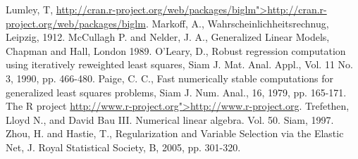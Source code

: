 \documentclass[10pt]{article} %
\begin{document}
\begin{thebibliography}{99}
 Lumley, T, \url{http://cran.r-project.org/web/packages/biglm">http://cran.r-project.org/web/packages/biglm}.
 Markoff, A., Wahrscheinlichheitsrechnug,  Leipzig, 1912.
 McCullagh P. and Nelder, J. A., Generalized Linear Models, Chapman and Hall, London 1989.
 O'Leary, D., Robust regression computation using iteratively reweighted least squares, Siam J. Mat. Anal. Appl., Vol. 11 No. 3, 1990, pp. 466-480.
 Paige, C. C., Fast numerically stable computations for generalized least squares problems, Siam J. Num. Anal., 16, 1979, pp. 165-171.
 The R project \url{http://www.r-project.org">http://www.r-project.org}.
 Trefethen, Lloyd N., and David Bau III. Numerical linear algebra. Vol. 50. Siam, 1997.
 Zhou, H. and Hastie, T., Regularization and Variable Selection via the Elastic Net, J. Royal Statistical Society, B, 2005, pp. 301-320.
\end{thebibliography}
\end{document}
